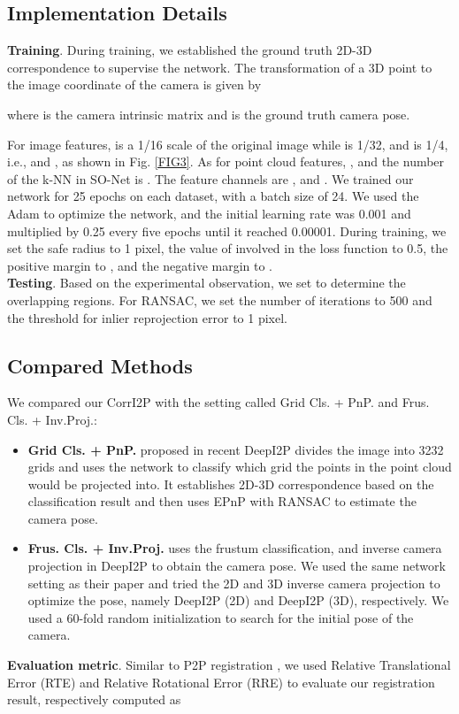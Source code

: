 \documentclass[lettersize,journal]{IEEEtran}
\begin{document}
\subsection{Implementation Details}
\noindent\textbf{Training}.
During training, we established the ground truth 2D-3D correspondence to supervise the network. The transformation of a 3D point   to the image coordinate of the camera  is given by

 
where  is the camera intrinsic matrix and  is the ground truth camera pose.

For image features,  is a 1/16 scale of the original image while  is 1/32, and  is 1/4, i.e.,  and , as shown in Fig. \ref{FIG3}. As for point cloud features, , and the number of the k-NN in SO-Net \cite{SONET} is . The feature channels are ,  and . We trained our network for 25 epochs on each dataset, with a batch size of 24. We used the Adam \cite{ADAM} to optimize the network, and the initial learning rate was 0.001 and multiplied by 0.25 every five epochs until it reached 0.00001. During training, we set the safe radius  to 1 pixel, the value of  involved in the loss function to 0.5, the positive margin to , and the negative margin to . \\


\noindent\textbf{Testing}.
Based on the experimental observation, we set  to determine the overlapping regions. For RANSAC, we set the number of iterations to
500 and the threshold for inlier reprojection error to 1 pixel.

\subsection{Compared Methods}
We compared our CorrI2P with  the setting called Grid Cls. + PnP. and Frus. Cls. + Inv.Proj.:
\begin{itemize}
\item{\textbf{Grid Cls. + PnP.}}  proposed in recent DeepI2P \cite{DEEPI2P} divides the image into 3232 grids and uses the network to classify which grid the points in the point cloud would be projected into.
It establishes 2D-3D correspondence based on the classification result and then uses EPnP with RANSAC to estimate the camera pose.

\item{\textbf{Frus. Cls. + Inv.Proj.}}  uses the frustum classification, and inverse camera projection in DeepI2P \cite{DEEPI2P} to obtain the camera pose. We used the same network setting as their paper and tried the 2D and 3D inverse camera projection to optimize the pose, namely DeepI2P (2D) and DeepI2P (3D), respectively. We used a 60-fold random initialization to search for the initial pose of the camera. \\

\end{itemize} 
\textbf{Evaluation metric}.
Similar to P2P registration \cite{METRIC}, we used Relative Translational Error (RTE)  and Relative Rotational Error (RRE)   to evaluate our registration result, respectively computed as 
\end{document}
